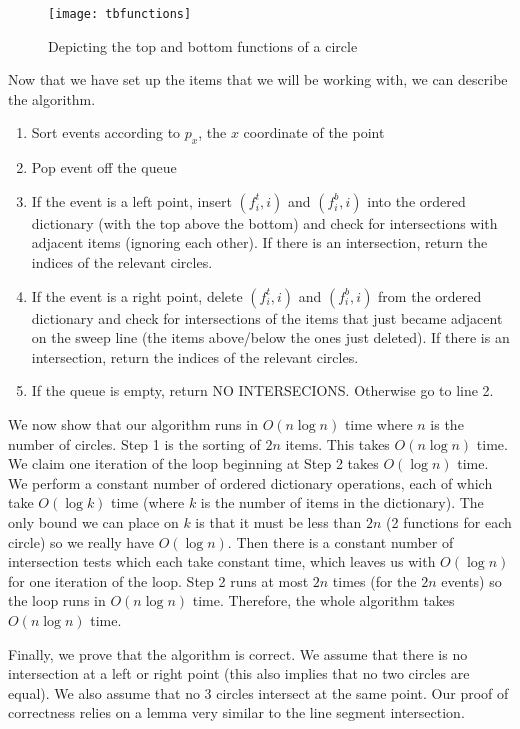 \documentclass[11pt]{article}
\begin{document}
\begin{figure}[h]
   \centering
   \texttt{[image: tbfunctions]}
   \caption{Depicting the top and bottom functions of a circle}
   \label{fig:tbfunctions}
\end{figure}

\noindent Now that we have set up the items that we will be working with, we can describe the algorithm.
\begin{enumerate}
    \item Sort events according to $p_x$, the $x$ coordinate of the point
    \item Pop event off the queue
    \item If the event is a left point, insert $(f_i^t, i)$ and $(f_i^b, i)$ into the ordered dictionary (with the top above the bottom) and check for intersections with adjacent items (ignoring each other).
    If there is an intersection, return the indices of the relevant circles.
    \item If the event is a right point, delete $(f_i^t, i)$ and $(f_i^b, i)$ from the ordered dictionary and check for intersections of the items that just became adjacent on the sweep line (the items above/below the ones just deleted).
    If there is an intersection, return the indices of the relevant circles.
    \item If the queue is empty, return NO INTERSECIONS.
    Otherwise go to line 2.
\end{enumerate}

\noindent We now show that our algorithm runs in $O(n \log n)$ time where $n$ is the number of circles.
Step 1 is the sorting of $2n$ items.
This takes $O(n \log n)$ time.
We claim one iteration of the loop beginning at Step 2 takes $O(\log n)$ time.
We perform a constant number of ordered dictionary operations, each of which take $O(\log k)$ time (where $k$ is the number of items in the dictionary).
The only bound we can place on $k$ is that it must be less than $2n$ (2 functions for each circle) so we really have $O(\log n)$.
Then there is a constant number of intersection tests which each take constant time, which leaves us with $O(\log n)$ for one iteration of the loop.
Step 2 runs at most $2n$ times (for the $2n$ events) so the loop runs in $O(n \log n)$ time.
Therefore, the whole algorithm takes $O(n \log n)$ time.

Finally, we prove that the algorithm is correct.
We assume that there is no intersection at a left or right point (this also implies that no two circles are equal).
We also assume that no 3 circles intersect at the same point.
Our proof of correctness relies on a lemma very similar to the line segment intersection.
\end{document}
